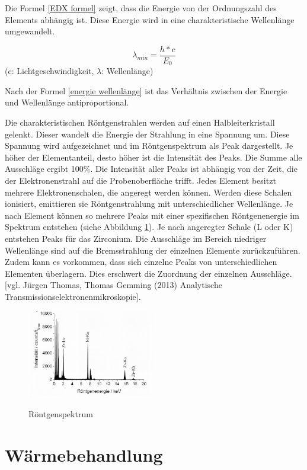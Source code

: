 \documentclass[a4paper, 11pt]{tubsreprt}
\begin{document}
Die Formel \eqref{EDX formel} zeigt, dass die Energie von der Ordnungszahl des Elements abhängig ist. Diese Energie wird in eine charakteristische Wellenlänge umgewandelt. 

\begin{equation}
\label{energie wellenlänge}
\lambda_{ min }=\frac{ h*c }{ E_{ 0 } }
\end{equation}
(c: Lichtgeschwindigkeit, $\lambda$: Wellenlänge)

Nach der Formel \eqref{energie wellenlänge} ist das Verhältnis zwischen der Energie und Wellenlänge antiproportional.

Die charakteristischen Röntgenstrahlen werden auf einen Halbleiterkristall gelenkt. Dieser wandelt die Energie der Strahlung in eine Spannung um. Diese Spannung wird aufgezeichnet und im Röntgenspektrum als Peak dargestellt. Je höher der Elementanteil, desto höher ist die Intensität des Peaks. Die Summe alle Ausschläge ergibt 100\%. Die Intensität aller Peaks ist abhängig von der Zeit, die der Elektronenstrahl auf die Probenoberfläche trifft. 
Jedes Element besitzt mehrere Elektronenschalen, die angeregt werden können. Werden diese Schalen ionisiert, emittieren sie Röntgenstrahlung mit unterschiedlicher Wellenlänge. Je nach Element können so mehrere Peaks mit einer spezifischen Röntgenenergie im Spektrum entstehen (siehe Abbildung \ref{Roentgenspektrum}). Je nach angeregter Schale (L oder K) entstehen Peaks für das Zirconium. Die Ausschläge im Bereich niedriger Wellenlänge sind auf die Bremsstrahlung der einzelnen Elemente zurückzuführen. Zudem kann es vorkommen, dass sich einzelne Peaks von unterschiedlichen Elementen überlagern. Dies erschwert die Zuordnung der einzelnen Ausschläge. [vgl. Jürgen Thomas, Thomas Gemming (2013) Analytische Transmissionselektronenmikroskopie].

\begin{figure}
\centering
\includegraphics[width=0.5\textwidth]{Bilder/Roentgenspektrum.png}
\label{Roentgenspektrum}
\caption{Röntgenspektrum}
\end{figure}
\section{Wärmebehandlung}
\end{document}
